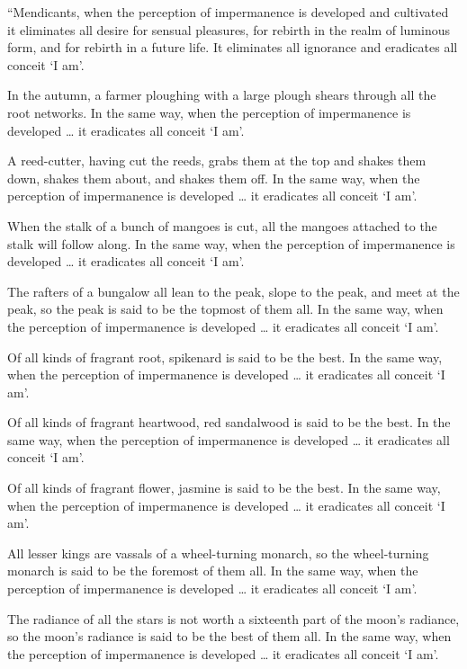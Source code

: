 \documentclass[12pt,openany]{book}%
\begin{document}
“Mendicants, when the perception of impermanence is developed and cultivated it eliminates all desire for sensual pleasures, for rebirth in the realm of luminous form, and for rebirth in a future life. It eliminates all ignorance and eradicates all conceit ‘I am’. 

In the autumn, a farmer ploughing with a large plough shears through all the root networks. In the same way, when the perception of impermanence is developed … it eradicates all conceit ‘I am’. 

A reed-cutter, having cut the reeds, grabs them at the top and shakes them down, shakes them about, and shakes them off. In the same way, when the perception of impermanence is developed … it eradicates all conceit ‘I am’. 

When the stalk of a bunch of mangoes is cut, all the mangoes attached to the stalk will follow along. In the same way, when the perception of impermanence is developed … it eradicates all conceit ‘I am’. 

The rafters of a bungalow all lean to the peak, slope to the peak, and meet at the peak, so the peak is said to be the topmost of them all. In the same way, when the perception of impermanence is developed … it eradicates all conceit ‘I am’. 

Of all kinds of fragrant root, spikenard is said to be the best. In the same way, when the perception of impermanence is developed … it eradicates all conceit ‘I am’. 

Of all kinds of fragrant heartwood, red sandalwood is said to be the best. In the same way, when the perception of impermanence is developed … it eradicates all conceit ‘I am’. 

Of all kinds of fragrant flower, jasmine is said to be the best. In the same way, when the perception of impermanence is developed … it eradicates all conceit ‘I am’. 

All lesser kings are vassals of a wheel-turning monarch, so the wheel-turning monarch is said to be the foremost of them all. In the same way, when the perception of impermanence is developed … it eradicates all conceit ‘I am’. 

The radiance of all the stars is not worth a sixteenth part of the moon’s radiance, so the moon’s radiance is said to be the best of them all. In the same way, when the perception of impermanence is developed … it eradicates all conceit ‘I am’. 
\end{document}
